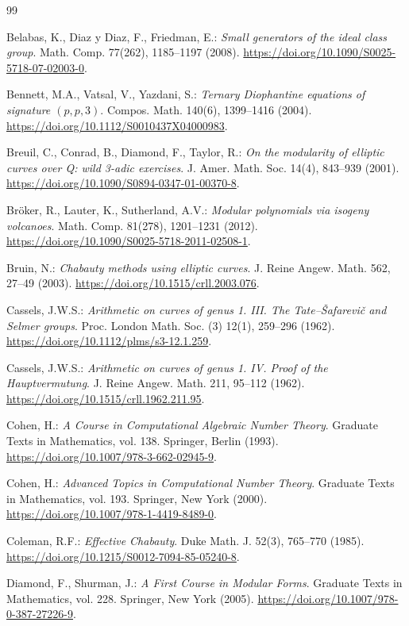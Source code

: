 \documentclass[11pt,a4paper]{article}
\theoremstyle{definition}\newtheorem{definition}[theorem]{Definition}
\theoremstyle{remark}\newtheorem{remark}[theorem]{Remark}
\begin{document}
\begin{thebibliography}{99}

Belabas, K., Diaz y Diaz, F., Friedman, E.: \emph{Small generators of the ideal class group}. Math. Comp. 77(262), 1185--1197 (2008). \url{https://doi.org/10.1090/S0025-5718-07-02003-0}.

Bennett, M.A., Vatsal, V., Yazdani, S.: \emph{Ternary Diophantine equations of signature $(p,p,3)$}. Compos. Math. 140(6), 1399--1416 (2004). \url{https://doi.org/10.1112/S0010437X04000983}.

Breuil, C., Conrad, B., Diamond, F., Taylor, R.: \emph{On the modularity of elliptic curves over Q: wild 3-adic exercises}. J. Amer. Math. Soc. 14(4), 843--939 (2001). \url{https://doi.org/10.1090/S0894-0347-01-00370-8}.

Br\"oker, R., Lauter, K., Sutherland, A.V.: \emph{Modular polynomials via isogeny volcanoes}. Math. Comp. 81(278), 1201--1231 (2012). \url{https://doi.org/10.1090/S0025-5718-2011-02508-1}.

Bruin, N.: \emph{Chabauty methods using elliptic curves}. J. Reine Angew. Math. 562, 27--49 (2003). \url{https://doi.org/10.1515/crll.2003.076}.

Cassels, J.W.S.: \emph{Arithmetic on curves of genus 1. III. The Tate--\v{S}afarevi\v{c} and Selmer groups}. Proc. London Math. Soc. (3) 12(1), 259--296 (1962). \url{https://doi.org/10.1112/plms/s3-12.1.259}.

Cassels, J.W.S.: \emph{Arithmetic on curves of genus 1. IV. Proof of the Hauptvermutung}. J. Reine Angew. Math. 211, 95--112 (1962). \url{https://doi.org/10.1515/crll.1962.211.95}.

Cohen, H.: \emph{A Course in Computational Algebraic Number Theory}. Graduate Texts in Mathematics, vol. 138. Springer, Berlin (1993). \url{https://doi.org/10.1007/978-3-662-02945-9}.

Cohen, H.: \emph{Advanced Topics in Computational Number Theory}. Graduate Texts in Mathematics, vol. 193. Springer, New York (2000). \url{https://doi.org/10.1007/978-1-4419-8489-0}.

Coleman, R.F.: \emph{Effective Chabauty}. Duke Math. J. 52(3), 765--770 (1985). \url{https://doi.org/10.1215/S0012-7094-85-05240-8}.

Diamond, F., Shurman, J.: \emph{A First Course in Modular Forms}. Graduate Texts in Mathematics, vol. 228. Springer, New York (2005). \url{https://doi.org/10.1007/978-0-387-27226-9}.


\end{thebibliography}
\end{document}
